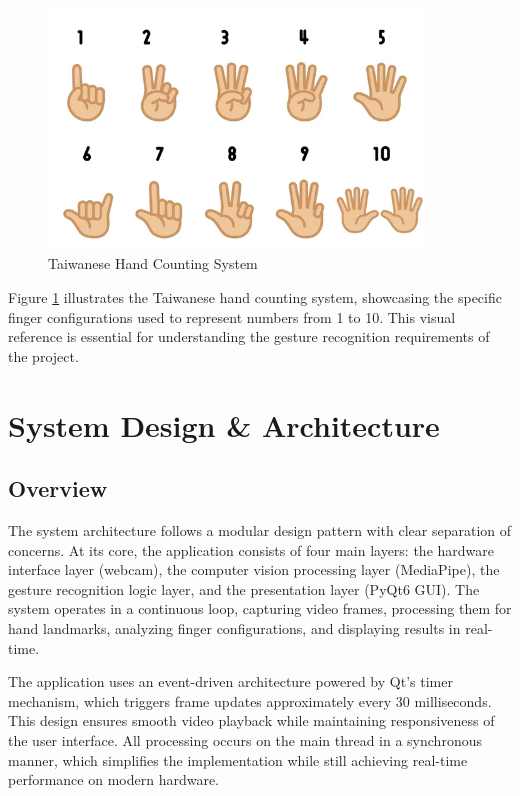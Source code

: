 \documentclass{article}
\begin{document}
\begin{figure}[H]
\centering
	\includegraphics[width=10cm]{taiwanese-hand-sign-clip-art-600nw-2462483897.png}
	\caption{Taiwanese Hand Counting System}
	\label{fig:taiwanese_hand_counting}
\end{figure}

Figure \ref{fig:taiwanese_hand_counting} illustrates the Taiwanese hand counting system, showcasing the specific finger configurations used to represent numbers from 1 to 10. This visual reference is essential for understanding the gesture recognition requirements of the project.

\section{System Design \& Architecture}

\subsection{Overview}

The system architecture follows a modular design pattern with clear separation of concerns. At its core, the application consists of four main layers: the hardware interface layer (webcam), the computer vision processing layer (MediaPipe), the gesture recognition logic layer, and the presentation layer (PyQt6 GUI). The system operates in a continuous loop, capturing video frames, processing them for hand landmarks, analyzing finger configurations, and displaying results in real-time.

The application uses an event-driven architecture powered by Qt's timer mechanism, which triggers frame updates approximately every 30 milliseconds. This design ensures smooth video playback while maintaining responsiveness of the user interface. All processing occurs on the main thread in a synchronous manner, which simplifies the implementation while still achieving real-time performance on modern hardware.
\end{document}
